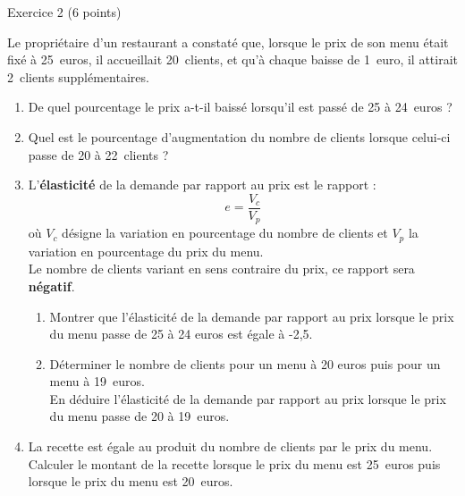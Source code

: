 
%
\begin{h2}Exercice 2 (6 points)\end{h2}
\par
Le propriétaire d'un restaurant a constaté que, lorsque le prix de son menu était fixé à 25~euros, il accueillait 20~clients, et qu'à chaque baisse de 1~euro, il attirait 2~clients supplémentaires.
%
%
\begin{enumerate}
     \item De quel pourcentage le prix a-t-il baissé lorsqu'il est passé de 25 à 24~euros ?
     \item Quel est le pourcentage d'augmentation du nombre de clients lorsque celui-ci passe de 20 à 22~clients ?
     \item L'\textbf{élasticité} de la demande par rapport au prix est le rapport :
     \[ e=\dfrac{V_c}{V_p} \]
     où $V_c$ désigne la variation en pourcentage du nombre de clients et $V_p$ la variation en pourcentage du prix du menu. \\
     Le nombre de clients variant en sens contraire du prix, ce rapport sera \textbf{négatif}.
     \par
     \begin{enumerate}[label=\alph*.]
          \item
          Montrer que l'élasticité de la demande par rapport au prix lorsque le prix du menu passe de 25 à 24 euros est égale à -2,5.
          \item
          Déterminer le nombre de clients pour un menu à 20 euros puis pour un menu à 19~euros.\\
          En déduire l'élasticité de la demande par rapport au prix lorsque le prix du menu passe de 20 à 19~euros.
     \end{enumerate}
     \item La recette est égale au produit du nombre de clients par le prix du menu.
     Calculer le montant de la recette lorsque le prix du menu est 25~euros puis lorsque le prix du menu est 20~euros.
\end{enumerate}
